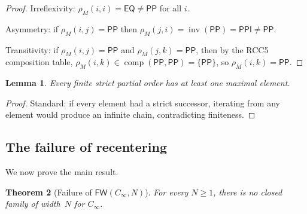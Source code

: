 \documentclass[11pt]{article}
\newtheorem{theorem}{Theorem}[section]
\newtheorem{lemma}[theorem]{Lemma}
\theoremstyle{definition}
\newcommand{\Eq}{\mathsf{EQ}}
\newcommand{\Pp}{\mathsf{PP}}
\newcommand{\Ppi}{\mathsf{PPI}}
\newcommand{\inv}{\operatorname{inv}}
\newcommand{\comp}{\operatorname{comp}}
\begin{document}
\begin{proof}
Irreflexivity: $\rho_M(i,i)=\Eq\ne\Pp$ for all $i$.

Asymmetry: if $\rho_M(i,j)=\Pp$ then $\rho_M(j,i)=\inv(\Pp)=\Ppi\ne\Pp$.

Transitivity: if $\rho_M(i,j)=\Pp$ and $\rho_M(j,k)=\Pp$, then by
the RCC5 composition table, $\rho_M(i,k)\in\comp(\Pp,\Pp)=\{\Pp\}$,
so $\rho_M(i,k)=\Pp$.
\end{proof}

\begin{lemma}\label{lem:maximal}
Every finite strict partial order has at least one maximal element.
\end{lemma}

\begin{proof}
Standard: if every element had a strict successor, iterating from any
element would produce an infinite chain, contradicting finiteness.
\end{proof}

\subsection{The failure of recentering}

We now prove the main result.

\begin{theorem}[Failure of $\mathsf{FW}(C_\infty,N)$]\label{thm:main}
For every $N\ge 1$, there is no closed family of width~$N$ for
$C_\infty$.
\end{theorem}
\end{document}
